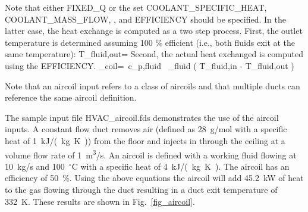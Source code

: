 \documentclass[11pt]{book}
\begin{document}
\noindent
Note that either {\ct FIXED\_Q} or the set {\ct COOLANT\_SPECIFIC\_HEAT}, {\ct COOLANT\_MASS\_FLOW}, , and {\ct EFFICIENCY} should be specified.  In the latter case, the heat exchange is computed as a two step process.  First, the outlet temperature is determined assuming 100 \% efficient (i.e., both fluids exit at the same temperature):
\be T_{\rm fluid,out}=
\ee
Second, the actual heat exchanged is computed using the {\ct EFFICIENCY}.
\be \dq_{\rm coil}=\eta \, c_{p,{\rm fluid}} \, \dm_{\rm fluid} \left( T_{\rm fluid,in} - T_{\rm fluid,out} \right)
\ee

\noindent
Note that an aircoil input refers to a class of aircoils and that multiple ducts can reference the same aircoil definition.

The sample input file {\ct HVAC\_aircoil.fds} demonstrates the use of the aircoil inputs.  A constant flow duct removes air (defined as 28~g/mol with a specific heat of 1~\si{kJ/(kg.K)}) from the floor and injects in through the ceiling at a volume flow rate of 1~\si{m^3/s}.  An aircoil is defined with a working fluid flowing at 10~kg/s and 100~$^\circ$C with a specific heat of 4~\si{kJ/(kg.K)}.  The aircoil has an efficiency of 50~\%.  Using the above equations the aircoil will add 45.2~kW of heat to the gas flowing through the duct resulting in a duct exit temperature of 332~K. These results are shown in  Fig.~\ref{fig_aircoil}.
\end{document}
